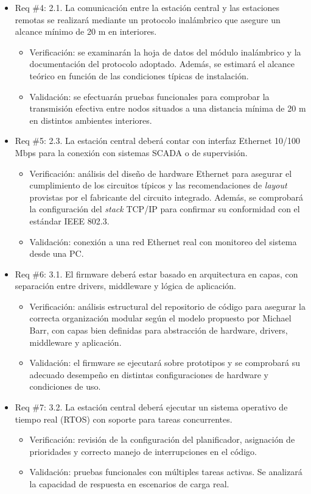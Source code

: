 \documentclass[
11pt, %
]{charter}
\begin{document}
\begin{itemize}
	\item Req \#4: 2.1. La comunicación entre la estación central y las estaciones remotas se realizará mediante un protocolo inalámbrico que asegure un alcance mínimo de 20 m en interiores.
	\begin{itemize}
		\item Verificación: se examinarán la hoja de datos del módulo inalámbrico y la documentación del protocolo adoptado. Además, se estimará el alcance teórico en función de las condiciones típicas de instalación.
		\item Validación: se efectuarán pruebas funcionales para comprobar la transmisión efectiva entre nodos situados a una distancia mínima de 20 m en distintos ambientes interiores.
	\end{itemize}
	
	\item Req \#5: 2.3. La estación central deberá contar con interfaz Ethernet 10/100 Mbps para la conexión con sistemas SCADA o de supervisión.
	\begin{itemize}
		\item Verificación: análisis del diseño de hardware Ethernet para asegurar el cumplimiento de los circuitos típicos y las recomendaciones de \textit{layout} provistas por el fabricante del circuito integrado. Además, se comprobará la configuración del \textit{stack} TCP/IP para confirmar su conformidad con el estándar IEEE 802.3.
		\item Validación: conexión a una red Ethernet real con monitoreo del sistema desde una PC.
	\end{itemize}
	
	\newpage
	\item Req \#6: 3.1. El firmware deberá estar basado en arquitectura en capas, con separación entre drivers, middleware y lógica de aplicación.
	\begin{itemize}
		\item Verificación: análisis estructural del repositorio de código para asegurar la correcta organización modular según el modelo propuesto por Michael Barr, con capas bien definidas para abstracción de hardware, drivers, middleware y aplicación.
		\item Validación: el firmware se ejecutará sobre prototipos y se comprobará su adecuado desempeño en distintas configuraciones de hardware y condiciones de uso.
	\end{itemize}
	
	\item Req \#7: 3.2. La estación central deberá ejecutar un sistema operativo de tiempo real (RTOS) con soporte para tareas concurrentes.
	\begin{itemize}
		\item Verificación: revisión de la configuración del planificador, asignación de prioridades y correcto manejo de interrupciones en el código.
		\item Validación: pruebas funcionales con múltiples tareas activas. Se analizará la capacidad de respuesta en escenarios de carga real.
	\end{itemize}
	

\end{itemize}
\end{document}
